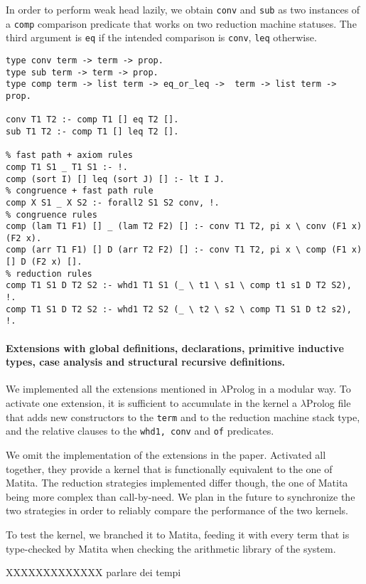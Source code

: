 In order to perform weak head lazily, we obtain \verb+conv+ and \verb+sub+ as two instances of a \verb+comp+ comparison predicate that works on two reduction machine statuses. The third argument is \verb+eq+ if the intended comparison is \verb+conv+, \verb+leq+ otherwise.

\begin{Verbatim}
type conv term -> term -> prop.
type sub term -> term -> prop.
type comp term -> list term -> eq_or_leq ->  term -> list term -> prop.

conv T1 T2 :- comp T1 [] eq T2 [].
sub T1 T2 :- comp T1 [] leq T2 [].

% fast path + axiom rules
comp T1 S1 _ T1 S1 :- !.
comp (sort I) [] leq (sort J) [] :- lt I J.
% congruence + fast path rule
comp X S1 _ X S2 :- forall2 S1 S2 conv, !.
% congruence rules
comp (lam T1 F1) [] _ (lam T2 F2) [] :- conv T1 T2, pi x \ conv (F1 x) (F2 x).
comp (arr T1 F1) [] D (arr T2 F2) [] :- conv T1 T2, pi x \ comp (F1 x) [] D (F2 x) [].
% reduction rules
comp T1 S1 D T2 S2 :- whd1 T1 S1 (_ \ t1 \ s1 \ comp t1 s1 D T2 S2), !.
comp T1 S1 D T2 S2 :- whd1 T2 S2 (_ \ t2 \ s2 \ comp T1 S1 D t2 s2), !.
\end{Verbatim}

\paragraph{Extensions with global definitions, declarations, primitive inductive types, case analysis and structural recursive definitions.}
We implemented all the extensions mentioned in $\lambda$Prolog in a modular way. To activate one extension, it is sufficient to accumulate in the kernel a $\lambda$Prolog file that adds new constructors to the \verb+term+ and to the reduction machine stack type, and the relative clauses to the \verb+whd1, conv+ and \verb+of+ predicates.

We omit the implementation of the extensions in the paper. Activated all together, they provide a kernel that is functionally equivalent to the one of Matita. The reduction strategies implemented differ though, the one of Matita being more complex than call-by-need. We plan in the future to synchronize the two strategies in order to reliably compare the performance of the two kernels.

To test the kernel, we branched it to Matita, feeding it with every term that is type-checked by Matita when checking the arithmetic library of the system.

XXXXXXXXXXXXX parlare dei tempi
